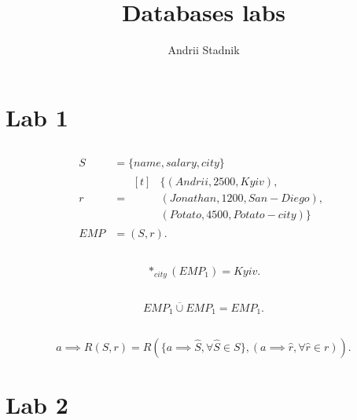 \documentclass[a4paper]{article}
\title{Databases labs}
\author{Andrii Stadnik}
\begin{document}
\maketitle
\tableofcontents
\section{Lab 1}
\subsection{}
\begin{align*}
    S &= \{name, salary, city\} \\
    r &=
    \begin{aligned}[t]
            &\{(Andrii, 2500, Kyiv), \\
            &(Jonathan, 1200, San-Diego), \\
            &(Potato, 4500, Potato-city)\}
    \end{aligned} \\
    EMP &= (S, r)
.\end{align*}
\subsection{}
\[
    *_{city}(EMP_1) = Kyiv
.\]
\subsection{}
\[
    EMP_1 \overline{\cup} EMP_1 = EMP_1
.\]
\subsection{}
\[
    a \implies R(S, r) = R(\{a \implies \hat{S}, \forall \hat{S} \in S\}, (a \implies
    \hat{r}, \forall \hat{r} \in r))
.\]
\section{Lab 2}
\end{document}
